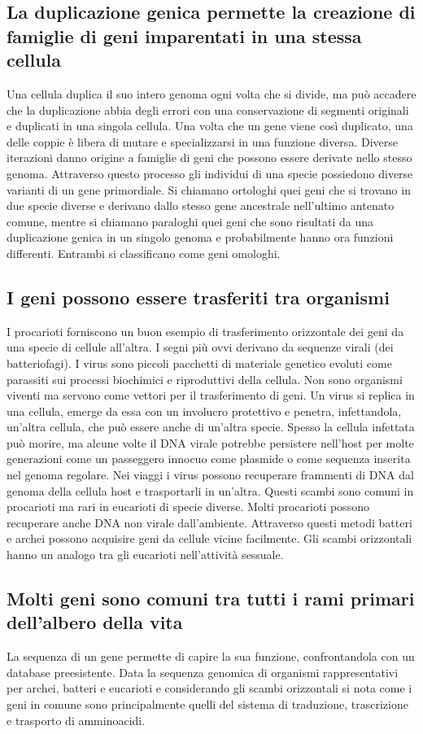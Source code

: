 \subsection{La duplicazione genica permette la creazione di famiglie di geni imparentati in una stessa cellula}
Una cellula duplica il suo intero genoma ogni volta che si divide, ma pu\`o accadere che la duplicazione abbia degli errori con una conservazione di segmenti originali e duplicati in
una singola cellula. Una volta che un gene viene cos\`i duplicato, una delle coppie \`e libera di mutare e specializzarsi in una funzione diversa. Diverse iterazioni danno origine 
a famiglie di geni che possono essere derivate nello stesso genoma. Attraverso questo processo gli individui di una specie possiedono diverse varianti di un gene primordiale. Si chiamano
ortologhi quei geni che si trovano in due specie diverse e derivano dallo stesso gene ancestrale nell'ultimo antenato comune, mentre si chiamano paraloghi quei geni che sono risultati
da una duplicazione genica in un singolo genoma e probabilmente hanno ora funzioni differenti. Entrambi si classificano come geni omologhi.
\subsection{I geni possono essere trasferiti tra organismi}
I procarioti forniscono un buon esempio di trasferimento orizzontale dei geni da una specie di cellule all'altra. I segni pi\`u ovvi derivano da sequenze virali (dei batteriofagi). I
virus sono piccoli pacchetti di materiale genetico evoluti come parassiti sui processi biochimici e riproduttivi della cellula. Non sono organismi viventi ma servono come vettori per il
trasferimento di geni. Un virus si replica in una cellula, emerge da essa con un involucro protettivo e penetra, infettandola, un'altra cellula, che pu\`o essere anche di un'altra specie.
Spesso la cellula infettata pu\`o morire, ma alcune volte il DNA virale potrebbe persistere nell'host per molte generazioni come un passeggero innocuo come plasmide o come sequenza
inserita nel genoma regolare. Nei viaggi i virus possono recuperare frammenti di DNA dal genoma della cellula host e trasportarli in un'altra. Questi scambi sono comuni in procarioti ma
rari in eucarioti di specie diverse. Molti procarioti possono recuperare anche DNA non virale dall'ambiente. Attraverso questi metodi batteri e archei possono acquisire geni da cellule
vicine facilmente. Gli scambi orizzontali hanno un analogo tra gli eucarioti nell'attivit\`a sessuale. 
\subsection{Molti geni sono comuni tra tutti i rami primari dell'albero della vita}
La sequenza di un gene permette di capire la sua funzione, confrontandola con un database preesistente. Data la sequenza genomica di organismi rappresentativi per archei, batteri e 
eucarioti e considerando gli scambi orizzontali si nota come i geni in comune sono principalmente quelli del sistema di traduzione, trascrizione e trasporto di amminoacidi. 
